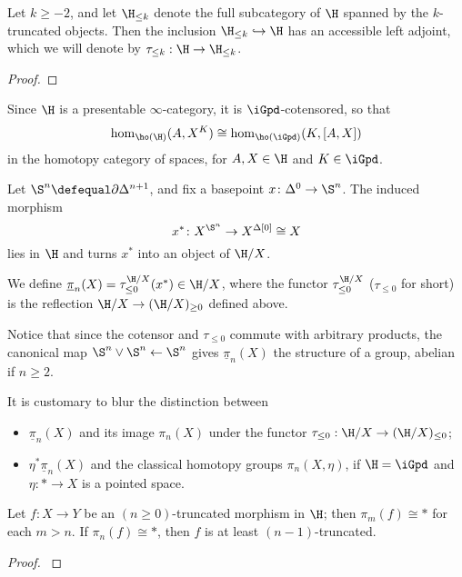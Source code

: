 \documentclass[12pt]{amsart}
\begin{document}
\begin{proposition}
Let $k\ge -2$, and let $\H_{\le k}$ denote the full subcategory of $\H$ spanned by the $k$-truncated objects.
Then the inclusion $\H_{\le k} \hookrightarrow \H$ has an accessible left adjoint, which we will denote by $\tau_{\le k} : \H \to \H_{\le k}$.
\end{proposition}
\begin{proof}

\end{proof}
\begin{remark}
Since $\H$ is a presentable $\infty$-category, it is $\iGpd$-cotensored, so that
\[
\hom_{\ho(\H)}(A, X^K) \cong \hom_{\ho(\iGpd)}(K,[A,X])
\]
in the homotopy category of spaces, for $A,X\in\H$ and $K\in\iGpd$.
\end{remark}
\begin{definition}
Let $\S^n \defequal \partial\Delta^{n+1}$, and fix a basepoint $x \colon \Delta^0 \to \S^n$. The induced morphism
\[
x^* \colon X^{\S^n} \to X^{\Delta[0]}\cong X
\]
lies in $\H$ and turns $x^*$ into an object of $\H/X$.

We define $\underline{\pi}_n(X) = \tau_{\le 0}^{\H/X}(x^*) \in \H/X$, where the functor $\tau_{\le 0}^{\H/X}$ ($\tau_{\le 0}$ for short) is the reflection $\H/X \to (\H/X)_{\ge 0}$ defined above.
\end{definition}
Notice that since the cotensor and $\tau_{\le 0}$ commute with arbitrary products, the canonical map $\S^n\vee \S^n \leftarrow \S^n$ gives $\underline{\pi}_n(X)$ the structure of a group, abelian if $n\ge 2$.
\begin{notat}
It is customary to blur the distinction between
\begin{itemize}
	\item $\underline{\pi}_n(X)$ and its image $\pi_n(X)$ under the functor $\tau_{\le 0} : \H/X \to (\H/X)_{\le 0}$;
	\item $\eta^*\underline{\pi}_n(X)$ and the classical homotopy groups $\pi_n(X,\eta)$, if $\H=\iGpd$ and $\eta : * \to X$ is a pointed space.
\end{itemize}
\end{notat}
\begin{proposition}
Let $f : X \to Y$ be an $(n\ge 0)$-truncated morphism in $\H$; then $\pi_m(f) \cong *$ for each $m > n$. If $\pi_n(f) \cong *$, then $f$ is at least $(n-1)$-truncated.
\end{proposition}
\begin{proof}
\cite[6.5.1.7]{HTT}
\end{proof}
\end{document}
